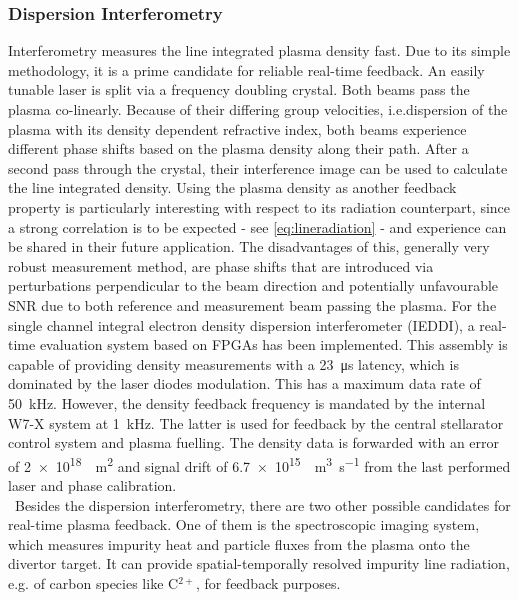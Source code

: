         \subsubsection*{Dispersion Interferometry}%
%
            Interferometry measures the line integrated plasma density fast. Due to its simple methodology, it is a prime candidate for reliable real-time feedback\cite{Mlynek2010,Boboc2012}. An easily tunable laser is split via a frequency doubling crystal. Both beams pass the plasma co-linearly. Because of their differing group velocities, i.e.dispersion of the plasma with its density dependent refractive index, both beams experience different phase shifts based on the plasma density along their path. After a second pass through the crystal, their interference image can be used to calculate the line integrated density. Using the plasma density as another feedback property is particularly interesting with respect to its radiation counterpart, since a strong correlation is to be expected - see \cref{eq:lineradiation} - and experience can be shared in their future application. The disadvantages of this, generally very robust measurement method, are phase shifts that are introduced via perturbations perpendicular to the beam direction and potentially unfavourable SNR due to both reference and measurement beam passing the plasma\cite{Knauer2016}. For the single channel integral electron density dispersion interferometer (IEDDI), a real-time evaluation system based on FPGAs has been implemented. This assembly is capable of providing density measurements with a \SI{23}{\micro\second} latency, which is dominated by the laser diodes modulation. This has a maximum data rate of \SI{50}{\kilo\hertz}. However, the density feedback frequency is mandated by the internal W7-X system at \SI{1}{\kilo\hertz}. The latter is used for feedback by the central stellarator control system and plasma fuelling\cite{Spring2017}. The density data is forwarded with an error of \SI{2e18}{\per\square\meter} and signal drift of \SI{6.7e15}{\per\cubic\meter\per\second} from the last performed laser and phase calibration\cite{Brunner2018}.\\%

        \,\newline%
        Besides the dispersion interferometry, there are two other possible candidates for real-time plasma feedback. One of them is the spectroscopic imaging system, which measures impurity heat and particle fluxes from the plasma onto the divertor target. It can provide spatial-temporally resolved impurity line radiation, e.g. of carbon species like C$^{2+}$, for feedback purposes.%
%
